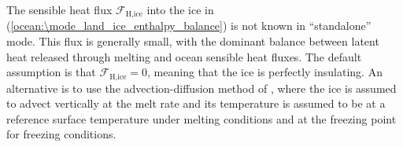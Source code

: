 The sensible heat flux $\mathcal{F}_\textrm{H,ice}$ into the ice in 
(\ref{ocean:\mode_land_ice_enthalpy_balance}) is not known in ``standalone'' mode.  This flux
is generally small, with the dominant balance between latent heat released through melting
and ocean sensible heat fluxes.  The default assumption is that 
$\mathcal{F}_\textrm{H,ice} = 0$, meaning that the ice is perfectly insulating.  An alternative
is to use the advection-diffusion method of \citet{Holland1999}, where the ice is assumed
to advect vertically at the melt rate and its temperature is assumed
to be at a reference surface temperature under melting conditions and at 
the freezing point for freezing conditions.


